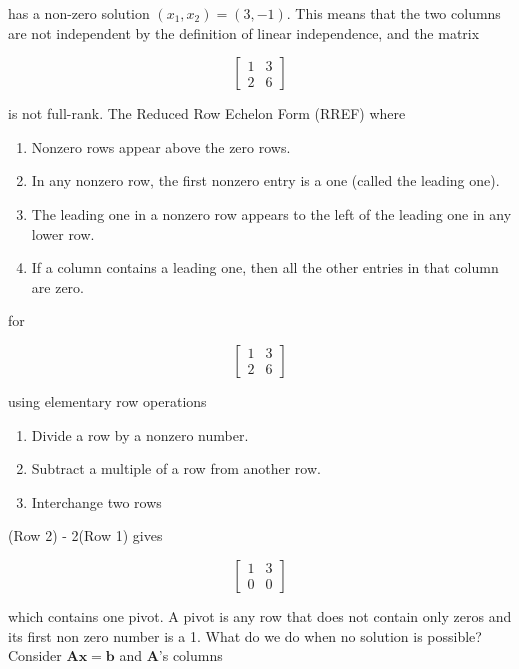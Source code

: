 \documentclass[main.tex]{subfiles}
\begin{document}
    has a non-zero solution $\left(x_{1}, x_{2}\right)=(3,-1)$. This means that the two columns are not independent by the definition of linear independence, and the matrix 
    
    $$\left[\begin{array}{ll}1 & 3 \\ 2 & 6\end{array}\right]$$
    
    is not full-rank. The Reduced Row Echelon Form (RREF) where 
    
    \begin{enumerate}
        \item Nonzero rows appear above the zero rows.
        \item In any nonzero row, the first nonzero entry is a one (called the leading one).
        \item The leading one in a nonzero row appears to the left of the leading one in any lower row.
        \item If a column contains a leading one, then all the other entries in that column are zero.
    \end{enumerate}
    
    for 
    
    $$\left[\begin{array}{ll}1 & 3 \\ 2 & 6\end{array}\right]$$
    
    using elementary row operations
    
    \begin{enumerate}
        \item Divide a row by a nonzero number.
        \item Subtract a multiple of a row from another row.
        \item Interchange two rows
    \end{enumerate}
    
    (Row 2) - 2(Row 1) gives
    
    $$\left[\begin{array}{ll}1 & 3 \\ 0 & 0\end{array}\right]$$

    which contains one pivot. A pivot is any row that does not contain only zeros and its first non zero number is a 1. What do we do when no solution is possible? Consider $\mathbf{A x}=\mathbf{b}$ and $\mathbf{A}$'s columns
    
\end{document}
